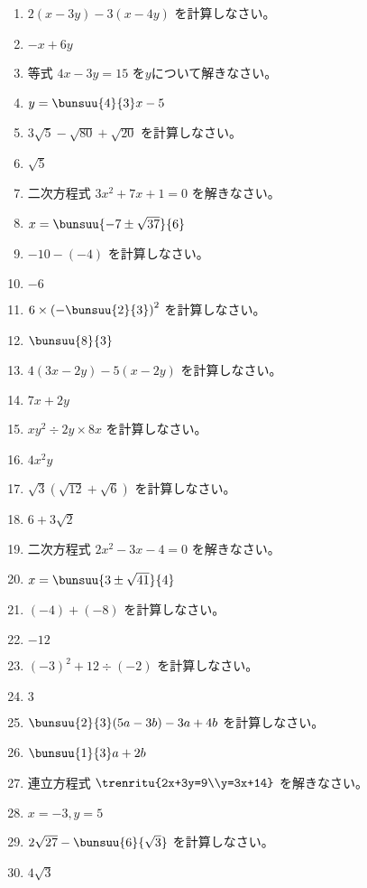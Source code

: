 \documentclass[uplatex,a4j,11pt]{jsreport}
\begin{document}
\begin{multicols}{2}
\begin{enumerate}
    \item $2(x-3y)-3(x-4y)$ を計算しなさい。%
    \item $-x+6y$
    \item 等式 $4x-3y=15$ を$y$について解きなさい。%
    \item $y=\bunsuu{4}{3}x-5$
    \item $3\sqrt{5}-\sqrt{80}+\sqrt{20}$ を計算しなさい。%
    \item $\sqrt{5}$
    \item 二次方程式 $3x^2+7x+1=0$ を解きなさい。%
    \item $x=\bunsuu{-7\pm\sqrt{37}}{6}$
    \item $-10-(-4)$ を計算しなさい。%
    \item $-6$
    \item $6\times\left(-\bunsuu{2}{3}\right)^2$ を計算しなさい。%
    \item $\bunsuu{8}{3}$
    \item $4(3x-2y)-5(x-2y)$ を計算しなさい。%
    \item $7x+2y$
    \item $xy^2\div2y\times8x$ を計算しなさい。%
    \item $4x^2y$
    \item $\sqrt{3}(\sqrt{12}+\sqrt{6})$ を計算しなさい。%
    \item $6+3\sqrt{2}$
    \item 二次方程式 $2x^2-3x-4=0$ を解きなさい。%
    \item $x=\bunsuu{3\pm\sqrt{41}}{4}$
    \item $(-4)+(-8)$ を計算しなさい。%
    \item $-12$
    \item $(-3)^2+12\div(-2)$ を計算しなさい。%
    \item $3$
    \item $\bunsuu{2}{3}(5a-3b)-3a+4b$ を計算しなさい。%
    \item $\bunsuu{1}{3}a+2b$
    \item 連立方程式 $\trenritu{2x+3y=9\\y=3x+14}$ を解きなさい。%
    \item $x=-3, y=5$
    \item $2\sqrt{27}-\bunsuu{6}{\sqrt{3}}$ を計算しなさい。%
    \item $4\sqrt{3}$

\end{enumerate}
\end{multicols}
\end{document}
